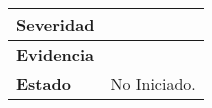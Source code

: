 \begin{longtable}{|l|l|}
\textbf{Severidad}                                                                      &                                                                                                                                                                  \\ \hline
\textbf{Evidencia}                                                                      &                                                                                                                                                                  \\ \hline
\textbf{Estado}                                                                         & No Iniciado.                                                                                                                                                     \\ \hline
\end{longtable}